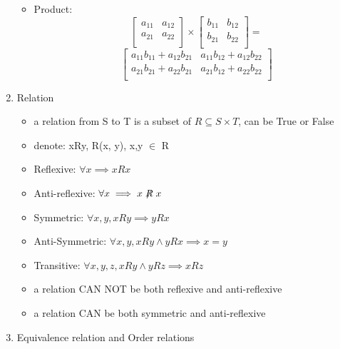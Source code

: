 \documentclass[11pt, a4paper]{article}
\begin{document}
\begin{multicols}{3}
\begin{enumerate}
\begin{itemize}
                \item Product:
                \[
                    \begin{bmatrix}
                        a_{11}  &  a_{12}\\
                        a_{21}  &  a_{22}\\
                    \end{bmatrix}
                    \times
                    \begin{bmatrix}
                        b_{11}  &  b_{12}\\
                        b_{21}  &  b_{22}\\
                    \end{bmatrix}
                    =
                \]
                \[
                    \begin{bmatrix}
                        a_{11}b_{11}+a_{12}b_{21}  &  a_{11}b_{12}+a_{12}b_{22}\\
                        a_{21}b_{21}+a_{22}b_{21}  &  a_{21}b_{12}+a_{22}b_{22}\\
                    \end{bmatrix}
                \]
            \end{itemize}
        \item Relation
            \begin{itemize}
                \item a relation from S to T is a subset of $R \subseteq S \times T$, can be True or False
                \item denote: xRy, R(x, y), x,y $\in$ R
                \item Reflexive: $\forall x \implies xRx$
                \item Anti-reflexive: $\forall x \implies x\not \mathrel{R}x$
                \item Symmetric: $\forall x,y, xRy \implies yRx$
                \item Anti-Symmetric: $\forall x,y, xRy \land yRx \implies x = y$
                \item Transitive: $\forall x,y,z, xRy \land yRz \implies xRz$
                \item a relation CAN NOT be both reflexive and anti-reflexive
                \item a relation CAN be both symmetric and anti-reflexive
            \end{itemize}
        \item Equivalence relation and Order relations

\end{enumerate}
\end{multicols}
\end{document}
